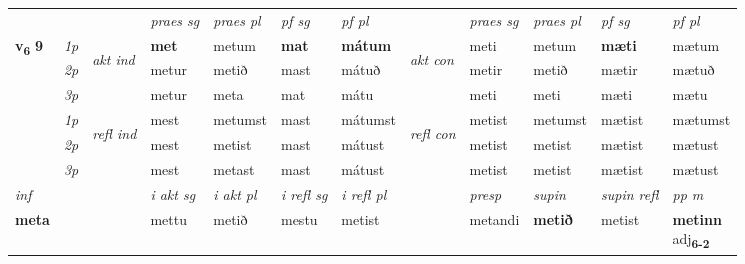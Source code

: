 \begin{longtable}[l]{X>{\footnotesize\itshape}llXXXXlXXXX}
\midrule

 & &   & \textit{praes sg}  & \textit{praes pl}    & \textit{ pf sg} & \textit{pf pl} & & \textit{praes sg}  & \textit{praes pl}    & \textit{pf sg} & \textit{pf pl }  \\ \cmidrule{4-7} \cmidrule{9-12}
 \multirow{2}{*}{{{\textbf{v{\textsubscript{6}}} \Large{\textbf{9}}}}}  & 1p & \multirow{3}{*}{\begin{turn}{90}\textit{akt ind}\end{turn}} & \textbf{met} & metum & \textbf{mat} & \textbf{mátum} & \multirow{3}{*}{\begin{turn}{90}\textit{akt con}\end{turn}} &meti & metum & \textbf{mæti} & mætum\\*
 & 2p &  &  metur  & metið & mast & mátuð & & metir & metið & mætir & mætuð \\*
 & 3p &  & metur & meta & mat & mátu & & meti & meti& mæti & mætu \\*
\cmidrule{4-7} \cmidrule{9-12}
 & 1p & \multirow{3}{*}{\begin{turn}{90}\textit{refl ind}\end{turn}}  & mest & metumst & mast & mátumst & \multirow{3}{*}{\begin{turn}{90}\textit{refl con}\end{turn}}  &metist & metumst & mætist & mætumst \\*
 & 2p &  & mest & metist & mast & mátust & &metist & metist & mætist & mætust \\*
 & 3p  & & mest & metast & mast & mátust & & metist & metist& mætist & mætust \\*
\cmidrule{4-7} \cmidrule{9-12}

   {\textit{inf}} & &  & \textit{i akt sg} & \textit{i akt pl} & \textit{i refl sg} & \textit{i refl pl} && \textit{presp} & \textit{supin} & \textit{supin refl} & \textit{pp m} \\*
  {\textbf{meta}} & && mettu  & metið & mestu & metist && metandi &  \textbf{metið} & metist & \specialcell{\textbf{metinn} \\ adj\textbf{\textsubscript{6-2}}} \\*

\midrule


\end{longtable}
